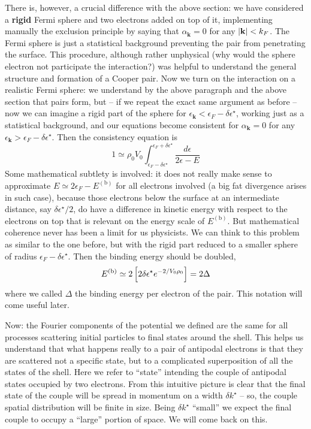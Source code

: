 There is, however, a crucial difference with the above section: we have considered a \textbf{rigid} Fermi sphere and two electrons added on top of it, implementing manually the exclusion principle by saying that $\alpha_\mathbf{k} = 0$ for any $\abs{\mathbf{k}} < k_F$. The Fermi sphere is just a statistical background preventing the pair from penetrating the surface. This procedure, although rather unphysical (why would the sphere electron not participate the interaction?) was helpful to understand the general structure and formation of a Cooper pair. Now we turn on the interaction on a realistic Fermi sphere: we understand by the above paragraph and the above section that pairs form, but -- if we repeat the exact same argument as before -- now we can imagine a rigid part of the sphere for $\epsilon_{\mathbf{k}} < \epsilon_F - \delta\epsilon^\star$, working just as a statistical background, and our equations become consistent for $\alpha_\mathbf{k} = 0$ for any $\epsilon_{\mathbf{k}} > \epsilon_F - \delta\epsilon^\star$. Then the consistency equation is
\[
	1 \simeq \rho_0 V_0 \int_{\epsilon_F-\delta\epsilon^\star}^{\epsilon_F+\delta\epsilon^\star} \frac{d\epsilon}{2\epsilon - E}
\]
Some mathematical subtlety is involved: it does not really make sense to approximate $E \simeq 2\epsilon_F-E^{(\mathrm{b})}$ for all electrons involved (a big fat divergence arises in such case), because those electrons below the surface at an intermediate distance, say $\delta\epsilon^\star/2$, do have a difference in kinetic energy with respect to the electrons on top that is relevant on the energy scale of $E^{(\mathrm{b})}$. But mathematical coherence never has been a limit for us physicists. We can think to this problem as similar to the one before, but with the rigid part reduced to a smaller sphere of radius $\epsilon_F - \delta\epsilon^\star$. Then the binding energy should be doubled,
\[
	E^{(\mathrm{b})} \simeq 2\left[{2\delta\epsilon^\star e^{-2/V_0 \rho_0}}\right] = 2 \Delta
\]
where we called $\Delta$ the binding energy per electron of the pair. This notation will come useful later.

Now: the Fourier components of the potential we defined are the same for all processes scattering initial particles to final states around the shell. This helps us understand that what happens really to a pair of antipodal electrons is that they are scattered not a specific state, but to a complicated superposition of all the states of the shell. Here we refer to ``state'' intending the couple of antipodal states occupied by two electrons. From this intuitive picture is clear that the final state of the couple will be spread in momentum on a width $\delta k^\star$ -- so, the couple spatial distribution will be finite in size. Being $\delta k^\star$ ``small'' we expect the final couple to occupy a ``large'' portion of space. We will come back on this.

